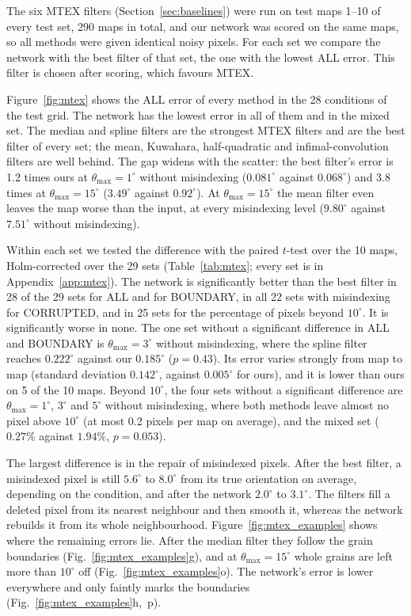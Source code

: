 The six MTEX filters (Section~\ref{sec:baselines}) were run on test maps 1--10
of every test set, 290 maps in total, and our network was scored on the same
maps, so all methods were given identical noisy pixels. For each set we
compare the network with the best filter of that set, the one with the lowest
ALL error. This filter is chosen after scoring, which favours MTEX.

Figure~\ref{fig:mtex} shows the ALL error of every method in the 28 conditions
of the test grid. The network has the lowest error in all of them and in the
mixed set. The median and spline filters are the strongest MTEX filters and
are the best filter of every set; the mean, Kuwahara, half-quadratic and
infimal-convolution filters are well behind. The gap widens with the scatter:
the best filter's error is 1.2 times ours at $\theta_{\max} = 1^\circ$ without
misindexing ($0.081^\circ$ against $0.068^\circ$) and 3.8 times at
$\theta_{\max} = 15^\circ$ ($3.49^\circ$ against $0.92^\circ$). At
$\theta_{\max} = 15^\circ$ the mean filter even leaves the map worse than the
input, at every misindexing level ($9.80^\circ$ against $7.51^\circ$ without
misindexing).

Within each set we tested the difference with the paired $t$-test over the
10 maps, Holm-corrected over the 29 sets (Table~\ref{tab:mtex}; every set is
in Appendix~\ref{app:mtex}). The network is significantly better than the best
filter in 28 of the 29 sets for ALL and for BOUNDARY, in all 22 sets with
misindexing for CORRUPTED, and in 25 sets for the percentage of pixels beyond
$10^\circ$. It is significantly worse in none. The one set without a
significant difference in ALL and BOUNDARY is $\theta_{\max} = 3^\circ$ without
misindexing, where the spline filter reaches $0.222^\circ$ against our
$0.185^\circ$ ($p = 0.43$). Its error varies strongly from map to map
(standard deviation $0.142^\circ$, against $0.005^\circ$ for ours), and it is
lower than ours on 5 of the 10 maps. Beyond $10^\circ$, the four sets without
a significant difference are $\theta_{\max} = 1^\circ$, $3^\circ$ and
$5^\circ$ without misindexing, where both methods leave almost no pixel above
$10^\circ$ (at most 0.2 pixels per map on average), and the mixed set
($0.27\%$ against $1.94\%$, $p = 0.053$).

The largest difference is in the repair of misindexed pixels. After the best
filter, a misindexed pixel is still $5.6^\circ$ to $8.0^\circ$ from its true
orientation on average, depending on the condition, and after the network
$2.0^\circ$ to $3.1^\circ$. The filters fill a deleted pixel from its nearest
neighbour and then smooth it, whereas the network rebuilds it from its whole
neighbourhood. Figure~\ref{fig:mtex_examples} shows where the remaining errors
lie. After the median filter they follow the grain boundaries
(Fig.~\ref{fig:mtex_examples}g), and at $\theta_{\max} = 15^\circ$ whole grains
are left more than $10^\circ$ off (Fig.~\ref{fig:mtex_examples}o). The
network's error is lower everywhere and only faintly marks the boundaries
(Fig.~\ref{fig:mtex_examples}h,~p).

